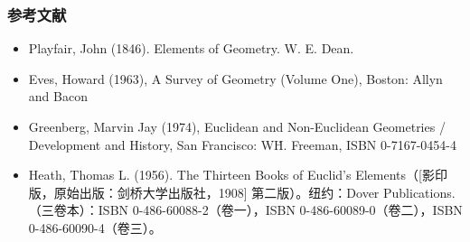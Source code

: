 \subsubsection{参考文献}
\begin{itemize}
\item Playfair, John (1846). Elements of Geometry. W. E. Dean.
\item Eves, Howard (1963), A Survey of Geometry (Volume One), Boston: Allyn and Bacon
\item Greenberg, Marvin Jay (1974), Euclidean and Non-Euclidean Geometries / Development and History, San Francisco: W\.H. Freeman, ISBN 0-7167-0454-4
\item Heath, Thomas L. (1956). The Thirteen Books of Euclid's Elements（[影印版，原始出版：剑桥大学出版社，1908] 第二版）。纽约：Dover Publications.（三卷本）：ISBN 0-486-60088-2（卷一），ISBN 0-486-60089-0（卷二），ISBN 0-486-60090-4（卷三）。
\end{itemize}